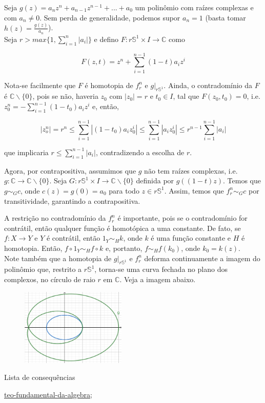 \begin{dem}
    Seja $g(z) = a_nz^n + a_{n - 1}z^{n - 1} +...+ a_0$
um polinômio com raízes complexas e com $a_n \neq 0$. Sem perda de generalidade, podemos supor $a_n = 1$ (basta tomar $h(z) = \frac{g(z)}{a_n}$).\\ Seja $r > max\{1, \sum_{i = 1}^n|a_i|\}$ e defino $F:r\mathbb{S}^1\times I \rightarrow \mathbb{C}$ como

$$F(z, t) = z^n + \sum_{i = 1}^{n-1}(1 - t)a_iz^i$$

Nota-se facilmente que $F$ é homotopia de $f_r^n$ e $g|_{r\mathbb{S}^1}$. Ainda, o contradomínio da $F$ é $\mathbb{C}\backslash \{0\}$, pois se não, haveria $z_0$ com $|z_0| = r$ e $t_0 \in I$, tal que $F(z_0, t_0) = 0$, i.e. $z_0^n = -\sum_{i = 1}^{n - 1}(1 - t_0)a_iz^i$ e, então, 

$$|z_o^n| = r^n \leq \sum_{i = 1}^{n - 1}|(1 - t_0)a_iz_0^i| \leq \sum_{i = 1}^{n - 1}|a_iz_0^i| \leq r^{n-1}\sum_{i = 1}^{n - 1}|a_i|$$

que implicaria $r \leq \sum_{i = 1}^{n - 1}|a_i|$, contradizendo a escolha de $r$.

Agora, por contrapositiva, assumimos que $g$ não tem raízes complexas, i.e. $g:\mathbb{C} \rightarrow \mathbb{C}\backslash\{0\}$. Seja $G: r\mathbb{S}^1\times I \rightarrow \mathbb{C}\backslash\{0\}$ definida por $g((1 - t)z)$. Temos que $g \sim_G c$, onde $c(z) = g(0) = a_0$ para todo $z \in r\mathbb{S}^1$. Assim, temos que $f_r^n \sim_G c$ por transitividade, garantindo a contrapositiva.  

\end{dem}
A restrição no contradomínio da $f_r^n$ é importante, pois se o contradomínio for contrátil, então qualquer função é homotópica a uma constante. De fato, se $f:X \rightarrow Y$ e $Y$ é contrátil, então $1_Y \sim_H k$, onde $k$ é uma função constante e $H$ é homotopia. Então, $f\circ1_Y \sim_H f\circ k$ e, portanto, $f \sim_H f(k_0)$, onde $k_0 = k(z)$. \\

Note também que a homotopia de $g|_{r\mathbb{S}^1}$ e $f_r^n$ deforma continuamente a imagem do polinômio que, restrito a $r\mathbb{S}^1$, torna-se uma curva fechada no plano dos complexos, no círculo de raio $r$ em $\mathbb{C}$. Veja a imagem abaixo.

\begin{figure}[h]
\includegraphics[width = 5cm]{conteudo/homotopia.png}
\end{figure}

\begin{titlemize}{Lista de consequências}
	\item \hyperref[teo-fundamental-da-algebra]{teo-fundamental-da-algebra};\\ 
	
\end{titlemize}
